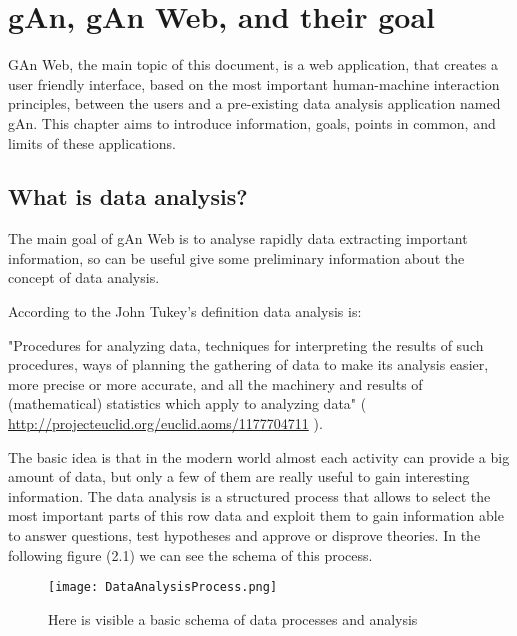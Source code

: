 
\chapter{gAn, gAn Web, and their goal} %

\label{Chapter2} %


GAn Web, the main topic of this document, is a web application, that creates a user friendly interface, based on the most important human-machine interaction principles, between the users and a pre-existing data analysis application named gAn. This chapter aims to introduce information, goals, points in common, and limits of these applications.

\section{What is data analysis?}

The main goal of gAn Web is to analyse rapidly data extracting important information, so can be useful give some preliminary information about the concept of data analysis.

According to the John Tukey's definition data analysis is: 

"Procedures for analyzing data, techniques for interpreting the results of such procedures, ways of planning the gathering of data to make its analysis easier, more precise or more accurate, and all the machinery and results of (mathematical) statistics which apply to analyzing data" 
( \url{http://projecteuclid.org/euclid.aoms/1177704711} ).

The basic idea is that in the modern world almost each activity can provide a big amount of data, but only a few of them are really useful to gain interesting information. The data analysis is a structured process that allows to select the most important parts of this row data and exploit them to gain information able to answer questions, test hypotheses and approve or disprove theories.
In the following figure (2.1) we can see the schema of this process. 

\begin{figure}[H]
\centering
\texttt{[image: DataAnalysisProcess.png]} 
\caption{Here is visible a basic schema of data processes and analysis}
\end{figure}

